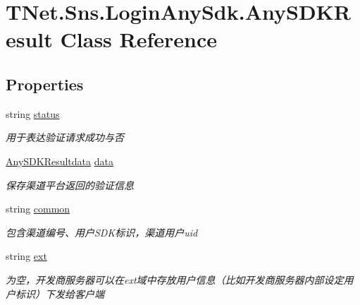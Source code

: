 \hypertarget{class_t_net_1_1_sns_1_1_login_any_sdk_1_1_any_s_d_k_result}{}\section{T\+Net.\+Sns.\+Login\+Any\+Sdk.\+Any\+S\+D\+K\+Result Class Reference}
\label{class_t_net_1_1_sns_1_1_login_any_sdk_1_1_any_s_d_k_result}


 


\subsection*{Properties}
\begin{DoxyCompactItemize}
\item 
string \mbox{\hyperlink{class_t_net_1_1_sns_1_1_login_any_sdk_1_1_any_s_d_k_result_aaaa14d9efd3faae04b590d03ac233f1f}{status}}
\begin{DoxyCompactList}\small\item\em 用于表达验证请求成功与否 \end{DoxyCompactList}\item 
\mbox{\hyperlink{class_t_net_1_1_sns_1_1_login_any_sdk_1_1_any_s_d_k_resultdata}{Any\+S\+D\+K\+Resultdata}} \mbox{\hyperlink{class_t_net_1_1_sns_1_1_login_any_sdk_1_1_any_s_d_k_result_adb30d541d14c01e878132fff56b44900}{data}}
\begin{DoxyCompactList}\small\item\em 保存渠道平台返回的验证信息 \end{DoxyCompactList}\item 
string \mbox{\hyperlink{class_t_net_1_1_sns_1_1_login_any_sdk_1_1_any_s_d_k_result_a1ceb27fbe411312fff9834a114ceecb2}{common}}
\begin{DoxyCompactList}\small\item\em 包含渠道编号、用户\+S\+D\+K标识，渠道用户uid \end{DoxyCompactList}\item 
string \mbox{\hyperlink{class_t_net_1_1_sns_1_1_login_any_sdk_1_1_any_s_d_k_result_a74ccb91c7d05183d79e9f402f10078ec}{ext}}
\begin{DoxyCompactList}\small\item\em 为空，开发商服务器可以在ext域中存放用户信息（比如开发商服务器内部设定用户标识）下发给客户端 \end{DoxyCompactList}\end{DoxyCompactItemize}


